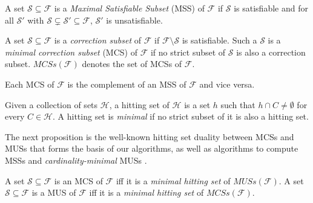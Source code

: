 \documentclass[a4paper,UKenglish,cleveref, autoref, thm-restate, pdfa]{lipics-v2021}
\newcommand\m[1]{\mathcal{#1}}
\newcommand\F{\ensuremath{\m{F} }\xspace}
\newcommand\formula{\ensuremath{\m{F} }\xspace}
\newcommand\muses[1]{\ensuremath{\mathit{MUSs}(#1)}\xspace}
\newcommand\mcses[1]{\ensuremath{\mathit{MCSs}(#1)}\xspace}
\begin{document}
	\begin{definition}
		A set $\m{S} \subseteq \formula$ is a \emph{Maximal Satisfiable Subset} (MSS) of $ \formula$ if $\m{S}$ is satisfiable and for all $\m{S}'$ with $\m{S}  \subsetneq  \m{S}'\subseteq\formula $, $\m{S}'$ is unsatisfiable.
	\end{definition}
	
	\begin{definition}
		A set $\m{S} \subseteq \formula$ is a \emph{correction subset} of \formula if $\formula\setminus\m{S}$ is satisfiable. 
		Such a $\m{S}$ is a \emph{minimal correction subset} (MCS)  of \formula if no strict subset of $\m{S}$ is also a correction subset. 
		\mcses{\F} denotes the set of MCSs of \F. 
	\end{definition}
	Each  MCS of \formula is the complement of an MSS of \formula and vice versa. 	
	
	\begin{definition}\label{def:minimal-hs}
		Given a collection of sets $\m{H}$, a hitting set of $\m{H}$ is a set $h$ such that  $h \cap C \neq \emptyset$ for every $C \in \m{H}$. A hitting set is \emph{minimal} if no strict subset of it is also a hitting set.
		
	\end{definition}
	
	The next proposition is the well-known hitting set duality \cite{DBLP:journals/jar/LiffitonS08,ai/Reiter87}  between MCSs and MUSs that forms the basis of our algorithms, as well as algorithms to compute MSSs \cite{DBLP:conf/sat/DaviesB13} and \emph{cardinality-minimal} MUSs \cite{ignatiev2015smallest}.
	
	\begin{proposition}\label{prop:MCS-MUS-hittingset}
		
		A set  $\m{S} \subseteq \formula$ is an MCS of $ \formula$ iff  it is a \emph{minimal hitting set} of \muses{\formula}.
		A set  $\m{S} \subseteq \formula$ is a MUS of $ \formula$ iff  it is a \emph{minimal hitting set} of \mcses{\formula}.
	\end{proposition}
	
\end{document}
